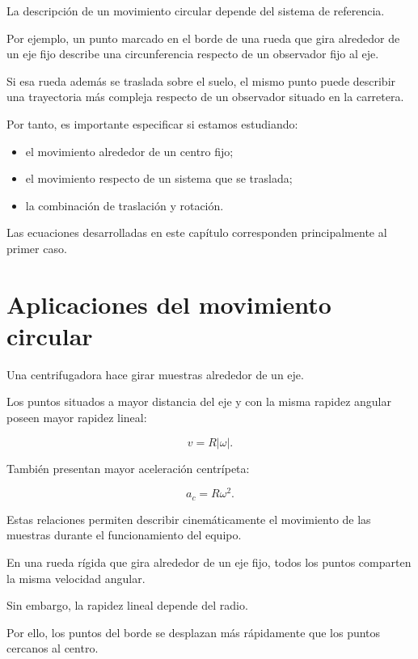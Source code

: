 La descripción de un movimiento circular depende del sistema de referencia.

Por ejemplo, un punto marcado en el borde de una rueda que gira alrededor
de un eje fijo describe una circunferencia respecto de un observador fijo al
eje.

Si esa rueda además se traslada sobre el suelo, el mismo punto puede
describir una trayectoria más compleja respecto de un observador situado en
la carretera.

Por tanto, es importante especificar si estamos estudiando:

\begin{itemize}
    \item el movimiento alrededor de un centro fijo;
    \item el movimiento respecto de un sistema que se traslada;
    \item la combinación de traslación y rotación.
\end{itemize}

Las ecuaciones desarrolladas en este capítulo corresponden principalmente al
primer caso.


\section{Aplicaciones del movimiento circular}

\begin{aplicacion}[Centrifugadoras]

Una centrifugadora hace girar muestras alrededor de un eje.

Los puntos situados a mayor distancia del eje y con la misma rapidez angular
poseen mayor rapidez lineal:

\[
v=R|\omega|.
\]

También presentan mayor aceleración centrípeta:

\[
a_c=R\omega^2.
\]

Estas relaciones permiten describir cinemáticamente el movimiento de las
muestras durante el funcionamiento del equipo.

\end{aplicacion}


\begin{aplicacion}

En una rueda rígida que gira alrededor de un eje fijo, todos los puntos
comparten la misma velocidad angular.

Sin embargo, la rapidez lineal depende del radio.

Por ello, los puntos del borde se desplazan más rápidamente que los puntos
cercanos al centro.

\end{aplicacion}


